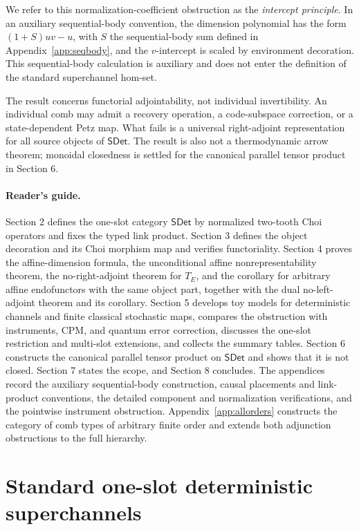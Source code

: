 \documentclass[11pt,a4paper]{article}
\theoremstyle{definition}
\theoremstyle{plain}
\theoremstyle{remark}
\newcommand{\SDet}{\mathsf{SDet}}
\begin{document}
We refer to this normalization-coefficient obstruction as the \emph{intercept principle}. In an auxiliary sequential-body convention, the dimension polynomial has the form $(1+S)uv-u$, with $S$ the sequential-body sum defined in Appendix~\ref{app:seqbody}, and the $v$-intercept is scaled by environment decoration. This sequential-body calculation is auxiliary and does not enter the definition of the standard superchannel hom-set.

The result concerns functorial adjointability, not individual invertibility. An individual comb may admit a recovery operation, a code-subspace correction, or a state-dependent Petz map. What fails is a universal right-adjoint representation for all source objects of $\SDet$. The result is also not a thermodynamic arrow theorem; monoidal closedness is settled for the canonical parallel tensor product in Section 6.

\paragraph{Reader's guide.} Section 2 defines the one-slot category $\SDet$ by normalized two-tooth Choi operators and fixes the typed link product. Section 3 defines the object decoration and its Choi morphism map and verifies functoriality. Section 4 proves the affine-dimension formula, the unconditional affine
nonrepresentability theorem, the no-right-adjoint theorem for $T_E$, and
the corollary for arbitrary affine endofunctors with the same object part,
together with the dual no-left-adjoint theorem and its corollary.
Section 5 develops toy models for deterministic channels and finite classical stochastic maps, compares the obstruction with instruments, CPM, and quantum error correction, discusses the one-slot restriction and multi-slot extensions, and collects the summary tables. Section 6 constructs the canonical parallel tensor product on $\SDet$ and shows that it is not closed. Section 7 states the scope, and Section 8 concludes. The appendices record the auxiliary sequential-body construction, causal placements and link-product conventions, the detailed component and normalization verifications, and the pointwise instrument obstruction. Appendix~\ref{app:allorders} constructs the category of comb types of arbitrary finite order and extends both adjunction obstructions to the full hierarchy.

\section{Standard one-slot deterministic superchannels}
\end{document}
